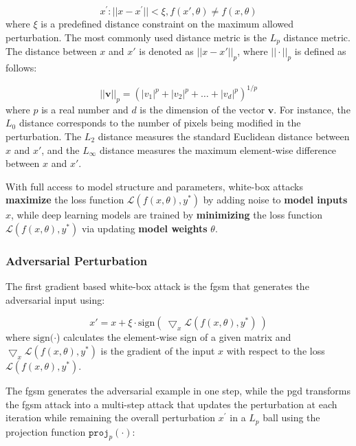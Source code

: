 \begin{equation}
x^{'}: ||x - x^{'}|| < \xi, f(x', \theta) \neq f(x, \theta)
\end{equation}
where $ \xi$ is a predefined distance constraint on the maximum allowed perturbation. The most commonly used distance metric is the $L_p$ distance metric. The distance between $x$ and $x'$ is denoted as $||x-x'||_{p}$, where $||\cdot||_p$ is defined as follows:

\begin{equation}
 ||\textbf{v}||_p = (|v_1|^p + |v_2|^p + \dots + |v_d|^p)^{1/p}
\end{equation}
where $p$ is a real number and $d$ is the dimension of the vector $\textbf{v}$. For instance, the $L_0$ distance corresponds to the number of pixels being modified in the perturbation. The $L_2$ distance measures the standard Euclidean distance between $x$ and $x'$, and the $L_\infty$ distance measures the maximum element-wise difference between $x$ and $x'$.

With full access to model structure and parameters, white-box attacks \textbf{maximize} the loss function  $\mathcal{L}(f(x, \theta), y^*)$ by adding noise to \textbf{ model inputs} $x$, while deep learning models are trained by \textbf{minimizing} the loss function  $\mathcal{L}(f(x, \theta), y^*)$ via updating \textbf{model weights} $\theta$.

\subsubsection{Adversarial Perturbation}

The first gradient based white-box attack is the \acrfull{fgsm} \citep{GoodfellowSS14} that generates the adversarial input using:

\begin{equation}
x' = x + \xi \cdot \text{sign}(\ \bigtriangledown_x \mathcal{L}(f(x, \theta), y^*)\ )    
\end{equation} 
where $\text{sign}(\cdot$) calculates the element-wise sign of a given matrix and $\bigtriangledown_x \mathcal{L}(f(x, \theta), y^*)$ is the gradient of the input $x$ with respect to the loss $\mathcal{L}(f(x, \theta), y^*)$.

The \acrshort{fgsm} generates the adversarial example in one step, while the \acrfull{pgd} \citep{madry2017towards} transforms the \acrshort{fgsm} attack into a multi-step attack that updates the perturbation at each iteration while remaining the overall perturbation $x^{'}$ in a $L_p$ ball using the projection function $\texttt{proj}_{p}(\cdot)$:

